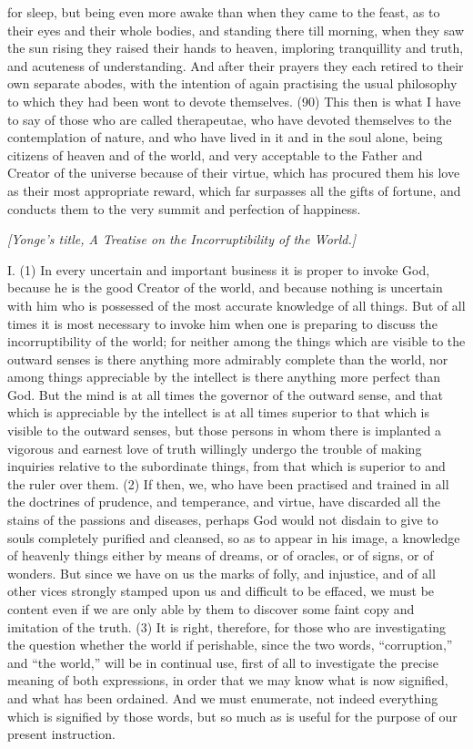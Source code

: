 for sleep, but being even more awake than when they came to the feast, as to their eyes and their
whole bodies, and standing there till morning, when they saw the sun rising they raised their hands
to heaven, imploring tranquillity and truth, and acuteness of understanding. And after their prayers
they each retired to their own separate abodes, with the intention of again practising the usual
philosophy to which they had been wont to devote themselves. (90) This then is what I have to say
of those who are called therapeutae, who have devoted themselves to the contemplation of nature,
and who have lived in it and in the soul alone, being citizens of heaven and of the world, and very
acceptable to the Father and Creator of the universe because of their virtue, which has procured
them his love as their most appropriate reward, which far surpasses all the gifts of fortune, and
conducts them to the very summit and perfection of happiness.


\emph{[Yonge's title, A Treatise on the Incorruptibility of the World.]}

I. (1) In every uncertain and important business it is proper to invoke God, because he is the
good Creator of the world, and because nothing is uncertain with him who is possessed of the
most accurate knowledge of all things. But of all times it is most necessary to invoke him when one
is preparing to discuss the incorruptibility of the world; for neither among the things which are
visible to the outward senses is there anything more admirably complete than the world, nor among
things appreciable by the intellect is there anything more perfect than God. But the mind is at all
times the governor of the outward sense, and that which is appreciable by the intellect is at all
times superior to that which is visible to the outward senses, but those persons in whom there is
implanted a vigorous and earnest love of truth willingly undergo the trouble of making inquiries
relative to the subordinate things, from that which is superior to and the ruler over them. (2) If then,
we, who have been practised and trained in all the doctrines of prudence, and temperance, and
virtue, have discarded all the stains of the passions and diseases, perhaps God would not disdain
to give to souls completely purified and cleansed, so as to appear in his image, a knowledge of
heavenly things either by means of dreams, or of oracles, or of signs, or of wonders. But since we
have on us the marks of folly, and injustice, and of all other vices strongly stamped upon us and
difficult to be effaced, we must be content even if we are only able by them to discover some faint
copy and imitation of the truth. (3) It is right, therefore, for those who are investigating the question
whether the world if perishable, since the two words, ``corruption,'' and ``the world,'' will be in
continual use, first of all to investigate the precise meaning of both expressions, in order that we
may know what is now signified, and what has been ordained. And we must enumerate, not indeed
everything which is signified by those words, but so much as is useful for the purpose of our
present instruction.

